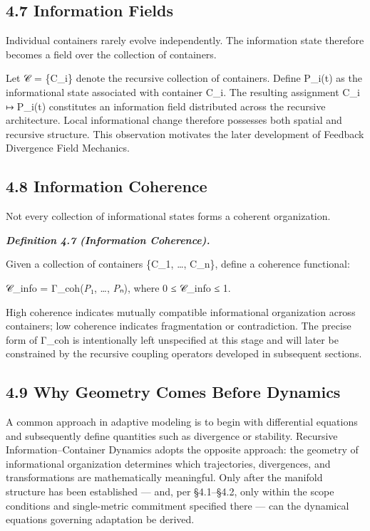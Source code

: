 \documentclass[
]{article}
\begin{document}
\hypertarget{information-fields}{%
\subsection{4.7 Information Fields}\label{information-fields}}

Individual containers rarely evolve independently. The information state
therefore becomes a field over the collection of containers.

Let 𝒞 = \{C\_i\} denote the recursive collection of containers. Define
P\_i(t) as the informational state associated with container C\_i. The
resulting assignment C\_i ↦ P\_i(t) constitutes an information field
distributed across the recursive architecture. Local informational
change therefore possesses both spatial and recursive structure. This
observation motivates the later development of Feedback Divergence Field
Mechanics.

\hypertarget{information-coherence}{%
\subsection{4.8 Information Coherence}\label{information-coherence}}

Not every collection of informational states forms a coherent
organization.

\emph{\textbf{Definition 4.7 (Information Coherence).}}

Given a collection of containers \{C\_1, \ldots, C\_n\}, define a
coherence functional:

𝒞\_info = Γ\_coh(\emph{P}₁, \ldots, \emph{P}ₙ), where 0 ≤ 𝒞\_info ≤ 1.

High coherence indicates mutually compatible informational organization
across containers; low coherence indicates fragmentation or
contradiction. The precise form of Γ\_coh is intentionally left
unspecified at this stage and will later be constrained by the recursive
coupling operators developed in subsequent sections.

\hypertarget{why-geometry-comes-before-dynamics}{%
\subsection{4.9 Why Geometry Comes Before
Dynamics}\label{why-geometry-comes-before-dynamics}}

A common approach in adaptive modeling is to begin with differential
equations and subsequently define quantities such as divergence or
stability. Recursive Information--Container Dynamics adopts the opposite
approach: the geometry of informational organization determines which
trajectories, divergences, and transformations are mathematically
meaningful. Only after the manifold structure has been established ---
and, per §4.1--§4.2, only within the scope conditions and single-metric
commitment specified there --- can the dynamical equations governing
adaptation be derived.
\end{document}
